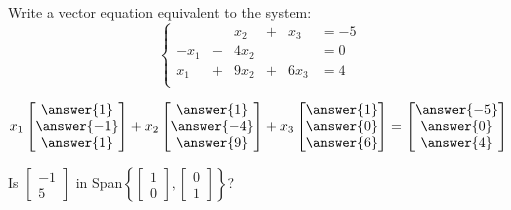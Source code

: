 \documentclass{ximera}
\begin{document}
  	\begin{question}
  		Write a vector equation equivalent to the system:
  			$$\left\{
  			\begin{array}{rrrrrl}
  			&&x_2&+&x_3 &=-5 \\
  			-x_1& -&4x_2 &&&=0\\
  			x_1&+&9x_2&+&6x_3 &= 4\\
  			\end{array} \right.$$
  		
  		$x_1\begin{bmatrix}
  		\answer{1}\\\answer{-1}\\\answer{1}
  		\end{bmatrix} +x_2 \begin{bmatrix}
  		\answer{1}\\\answer{-4}\\\answer{9}
  		\end{bmatrix}+x_3\begin{bmatrix}
  		\answer{1}\\\answer{0}\\\answer{6}
  		\end{bmatrix} =\begin{bmatrix}
  		\answer{-5}\\\answer{0}\\\answer{4}
  		\end{bmatrix}$
  			
  			\end{question}
  			
  			 	\begin{question}
  			 		Is $\begin{bmatrix} -1\\5\end{bmatrix}$ in Span$\left\{  \begin{bmatrix} 1\\0\end{bmatrix}, \begin{bmatrix} 0\\1\end{bmatrix}   \right\}$?
  			 		\begin{multipleChoice}
  			 		\end{multipleChoice}
  			 		
  			 	\end{question}
  	
  	
\end{document}
